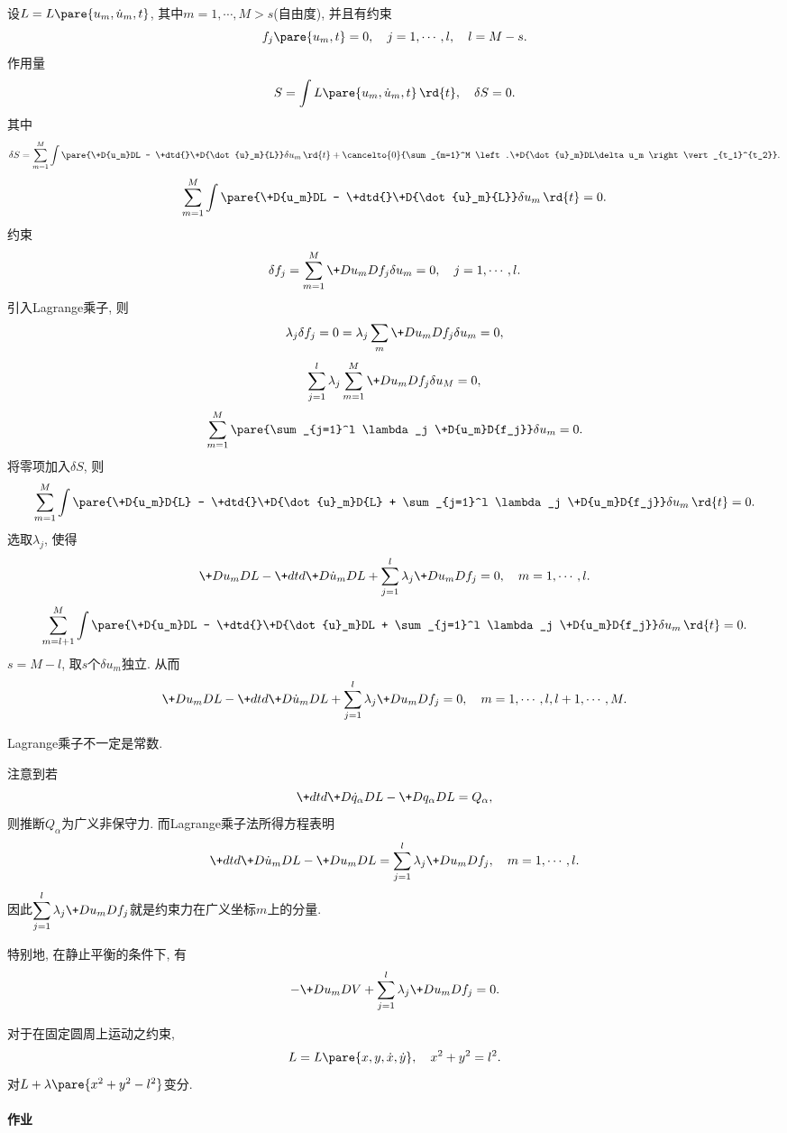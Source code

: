 \documentclass[../LectureNotes.tex]{subfiles}
\begin{document}
设$L = L\pare{u_m,\dot{u}_m, t}$, 其中$m=1,\cdots,M>s$(自由度), 并且有约束
\[ f_j\pare{u_m,t} = 0,\quad j = 1,\cdots, l,\quad l = M-s. \]
作用量
\[ S = \int L\pare{u_m,\dot{u}_m,t}\,\rd{t},\quad \delta S = 0. \]
其中
\[ \delta S = \sum_{m=1}^M \int\pare{\+D{u_m}DL - \+dtd{}\+D{\dot{u}_m}{L}}\delta u_m \,\rd{t} + \cancelto{0}{\sum_{m=1}^M \left.\+D{\dot{u}_m}DL\delta u_m \right\vert_{t_1}^{t_2}}. \]
\[ \sum_{m=1}^M \int \pare{\+D{u_m}DL - \+dtd{}\+D{\dot{u}_m}{L}}\delta u_m \,\rd{t} = 0. \]
约束
\[ \delta f_j = \sum_{m=1}^M \+D{u_m}D{f_j} \delta u_m = 0,\quad j = 1,\cdots, l. \]
引入Lagrange乘子, 则
\[ \lambda_j \delta f_j = 0 = \lambda_j \sum_m\+D{u_m}D{f_j}\delta u_m = 0, \]
\[ \sum_{j=1}^l \lambda_j \sum_{m=1}^M \+D{u_m}D{f_j} \delta u_M = 0, \]
\[ \sum_{m=1}^M \pare{\sum_{j=1}^l \lambda_j \+D{u_m}D{f_j}}\delta u_m = 0. \]
将零项加入$\delta S$, 则
\[ \sum_{m=1}^M \int \pare{\+D{u_m}D{L} - \+dtd{}\+D{\dot{u}_m}D{L} + \sum_{j=1}^l \lambda_j \+D{u_m}D{f_j}}\delta u_m\,\rd{t} = 0. \]
选取$\lambda_j$, 使得
\[ \+D{u_m}D{L} - \+dtd{} \+D{\dot{u}_m}DL + \sum_{j=1}^l \lambda_j \+D{u_m}D{f_j} = 0,\quad  m = 1,\cdots, l. \]
\[ \sum_{m=l+1}^M \int\pare{\+D{u_m}DL - \+dtd{}\+D{\dot{u}_m}DL + \sum_{j=1}^l \lambda_j \+D{u_m}D{f_j}}\delta u_m\,\rd{t} = 0. \]
$s = M-l$, 取$s$个$\delta u_m$独立. 从而
\[ \+D{u_m}DL - \+dtd{}\+D{\dot{u}_m}DL + \sum_{j=1}^l \lambda_j \+D{u_m}D{f_j} = 0,\quad m = 1,\cdots, l,l+1,\cdots, M. \]
\begin{pitfall}
    Lagrange乘子不一定是常数.
\end{pitfall}
注意到若
\[ \+dtd{} \+D{\dot{q}_\alpha}DL - \+D{q_\alpha}DL = Q_\alpha, \]
则推断$Q_\alpha$为广义非保守力. 而Lagrange乘子法所得方程表明
\[ \+dtd{} \+D{\dot{u}_m}DL - \+D{u_m}D{L} = \sum_{j=1}^l \lambda_j \+D{u_m}D{f_j},\quad  m = 1,\cdots, l. \]
因此$\displaystyle \sum_{j=1}^l \lambda_j \+D{u_m}D{f_j}$就是约束力在广义坐标$m$上的分量.
\par
特别地, 在静止平衡的条件下, 有
\[ -\+D{u_m}DV + \sum_{j=1}^l \lambda_j \+D{u_m}D{f_j} = 0. \]
\begin{sample}
    \begin{ex}
        对于在固定圆周上运动之约束,
        \[ L = L\pare{x,y,\dot{x},\dot{y}},\quad  x^2+y^2=l^2. \]
        对$L+\lambda\pare{x^2+y^2 - l^2}$变分.
    \end{ex}
\end{sample}


\paragraph{作业} %
\label{par:作业}
\end{document}
